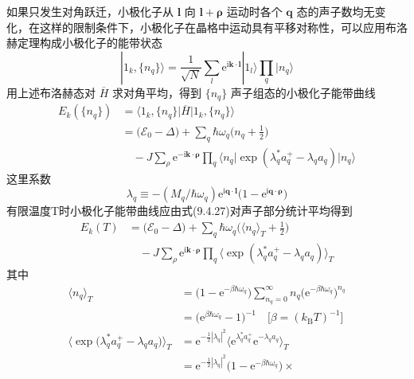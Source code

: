 如果只发生对角跃迁，小极化子从 $\boldsymbol{l}$ 向 $\boldsymbol{l}+\boldsymbol{\rho}$ 运动时各个 $\boldsymbol{q}$ 态的声子数均无变化，在这样的限制条件下，小极化子在晶格中运动具有平移对称性，可以应用布洛赫定理构成小极化子的能带状态
\begin{equation}
  |1_{k},\{n_{q}\}\rangle=\frac{1}{\sqrt{N}}\sum_{l}
  \mathrm{e}^{\mathrm{i}\boldsymbol{k}\cdot\boldsymbol{l}}|1_{l}\rangle
  \prod_{q}|n_{q}\rangle
\end{equation}
用上述布洛赫态对 $\overline{H}$ 求对角平均，得到 $\{n_{q}\}$ 声子组态的小极化子能带曲线
\begin{equation}
\begin{aligned}
  E_{k}(\{n_{q}\})&=\bigl\langle 1_{k},\{n_{q}\}\bigl|\overline{H}
  \bigr|1_{k},\{n_{q}\}\bigr\rangle\\
  &=\bigl(\mathscr{E}_{0}-\Delta\bigr)
  +\sum_{q}\hbar\omega_{q}\biggl(n_{q}+\frac{1}{2}\biggr)\\
  &\quad-J\sum_{\rho}\mathrm{e}^{-\mathrm{i}\boldsymbol{k}\cdot\boldsymbol{\rho}}
  \prod_{q}\bigl\langle n_{q}\bigl|\exp(\lambda_{q}^{*}a_{q}^{+}
  -\lambda_{q}a_{q})\bigr|n_{q}\bigr\rangle
\end{aligned}
\end{equation}
这里系数
\begin{equation}
  \lambda_{q}\equiv-\left(M_{q}/\hbar\omega_{q}\right)
  \mathrm{e}^{\mathrm{i}\boldsymbol{q}\cdot\boldsymbol{l}}
  \bigl(1-\mathrm{e}^{\mathrm{i}\boldsymbol{q}\cdot\boldsymbol{\rho}}\bigr)
\end{equation}
有限温度T时小极化子能带曲线应由式(9.4.27)对声子部分统计平均得到
\begin{equation}
\begin{aligned}
  E_{k}(T)&=\bigl(\mathscr{E}_{0}-\Delta\bigr)
  +\sum_{q}\hbar\omega_{q}\biggl(\langle n_{q}\rangle_{T}
  +\frac{1}{2}\biggr)\\
  &\quad-J\sum_{\rho}\mathrm{e}^{\mathrm{i}\boldsymbol{k}\cdot\boldsymbol{\rho}}
  \prod_{q}\bigl\langle\exp(\lambda_{q}^{*}a_{q}^{+}-\lambda_{q}a_{q})
  \bigr\rangle_{T}
\end{aligned}
\end{equation}
其中
\begin{equation}
\begin{aligned}
  \langle n_{q}\rangle_{T}
  &=\bigl(1-\mathrm{e}^{-\beta\hbar\omega_{q}}\bigr)
  \sum_{n_{q}=0}^{\infty}n_{q}\bigl(\mathrm{e}^{-\beta\hbar\omega_{q}}\bigr)^{n_{q}}\\
  &=\bigl(\mathrm{e}^{\beta\hbar\omega_{q}}-1\bigr)^{-1}
  \quad\bigl[\beta=\left(k_{\mathrm B}T\right)^{-1}\bigr]\\
  \bigl\langle\exp\bigl(\lambda_{q}^{*}a_{q}^{+}-\lambda_{q}a_{q}\bigr)
  \bigr\rangle_{T}
  &=\mathrm{e}^{-\frac{1}{2}|\lambda_{q}|^{2}}
  \bigl\langle\mathrm{e}^{\lambda_{q}^{*}a_{q}^{+}}
  \mathrm{e}^{-\lambda_{q}a_{q}}\bigr\rangle_{T}\\
  &=\mathrm{e}^{-\frac{1}{2}|\lambda_{q}|^{2}}
  \bigl(1-\mathrm{e}^{-\beta\hbar\omega_{q}}\bigr)\times
\end{aligned}
\end{equation}
